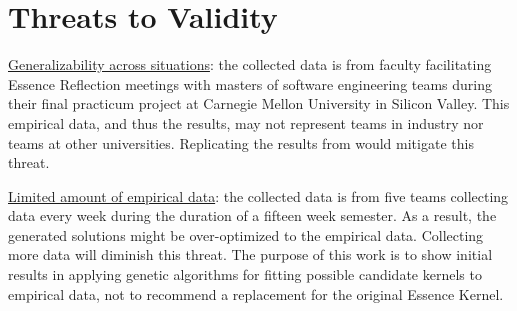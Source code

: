 \documentclass[conference]{IEEEtran}
\begin{document}





\section{Threats to Validity}

\underline{Generalizability across situations}: the collected data is from faculty facilitating Essence Reflection meetings \cite{EASE2014} with masters of software engineering teams during their final practicum project at Carnegie Mellon University in Silicon Valley. This empirical data, and thus the results, may not represent teams in industry nor teams at other universities. Replicating the results from \cite{ICSE2014} would mitigate this threat.

\underline{Limited amount of empirical data}: the collected data is from five teams collecting data every week during the duration of a fifteen week semester. As a result, the generated solutions might be over-optimized to the empirical data. Collecting more data will diminish this threat. The purpose of this work is to show initial results in applying genetic algorithms for fitting possible candidate kernels to empirical data, not to recommend a replacement for the original Essence Kernel. 
\end{document}

